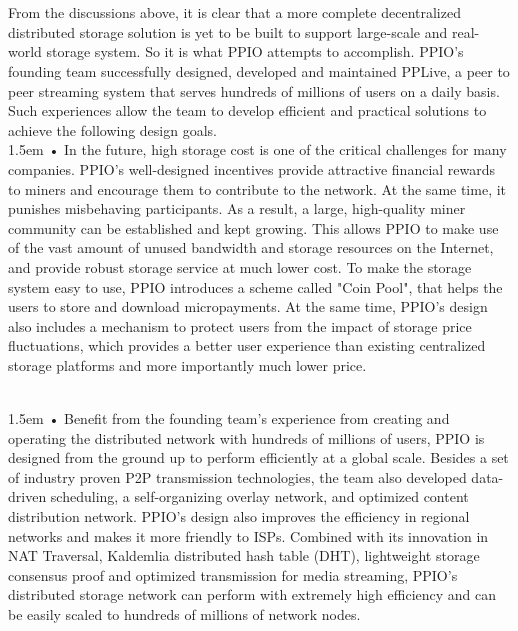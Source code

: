 \documentclass[10pt,a4paper]{article}
\begin{document}
\vspace{-0.5em}
\\ \\From the discussions above, it is clear that a more complete decentralized distributed storage solution is yet to be built to support large-scale and real-world storage system. So it is what PPIO attempts to accomplish. PPIO's founding team successfully designed, developed and maintained PPLive, a peer to peer streaming system that serves hundreds of millions of users on a daily basis. Such experiences allow the team to develop efficient and practical solutions to achieve the following design goals.
\vspace{-0.6em}
 \\ 
 
\hangindent 1.5em
\noindent   
• In the future, high storage cost is one of the critical challenges for many companies. PPIO's well-designed incentives provide attractive financial rewards to miners and encourage them to contribute to the network. At the same time, it punishes misbehaving participants. As a result, a large, high-quality miner community can be established and kept growing. This allows PPIO to make use of the vast amount of unused bandwidth and storage resources on the Internet, and provide robust storage service at much lower cost. To make the storage system easy to use, PPIO introduces a scheme called "Coin Pool", that helps the users to store and download micropayments. At the same time, PPIO's design also includes a mechanism to protect users from the impact of storage price fluctuations, which provides a better user experience than existing centralized storage platforms and more importantly much lower price.
\vspace{-0.6em}
\\ \

\hangindent 1.5em
\noindent   
• Benefit from the founding team's experience from creating and operating the distributed network with hundreds of millions of users, PPIO is designed from the ground up to perform efficiently at a global scale. Besides a set of industry proven P2P transmission technologies, the team also developed data-driven scheduling, a self-organizing overlay network, and optimized content distribution network. PPIO's design also improves the efficiency in regional networks and makes it more friendly to ISPs. Combined with its innovation in NAT Traversal, Kaldemlia distributed hash table (DHT), lightweight storage consensus proof and optimized transmission for media streaming, PPIO's distributed storage network can perform with extremely high efficiency and can be easily scaled to hundreds of millions of network nodes.
\vspace{-0.6em}
\\ \
\end{document}
